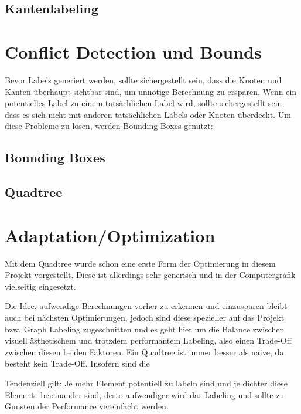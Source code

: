 \documentclass[final,nopreprintline]{elsarticle}
\begin{document}
\subsection{Kantenlabeling}
\label{subsec:labeling_edges}
    


\section{Conflict Detection und Bounds}
\label{sec:conflict}

Bevor Labels generiert werden, sollte sichergestellt sein, dass die Knoten und Kanten überhaupt sichtbar sind,
um unnötige Berechnung zu ersparen. Wenn ein potentielles Label zu einem tatsächlichen Label wird, sollte sichergestellt sein,
dass es sich nicht mit anderen tatsächlichen Labels oder Knoten überdeckt. Um diese Probleme zu lösen, werden Bounding Boxes genutzt:

\subsection{Bounding Boxes}
\label{subsec:bbox}
    

\subsection{Quadtree}
\label{subsec:quadtree}
    


\section{Adaptation/Optimization}
\label{sec:adaptation}

Mit dem Quadtree wurde schon eine erste Form der Optimierung in diesem Projekt vorgestellt.
Diese ist allerdings sehr generisch und in der Computergrafik vielseitig eingesetzt.

Die Idee, aufwendige Berechnungen vorher zu erkennen und einzusparen bleibt auch bei nächsten Optimierungen, jedoch sind diese
spezieller auf das Projekt bzw. Graph Labeling zugeschnitten und es geht hier um die Balance zwischen visuell ästhetischem und trotzdem performantem Labeling,
also einen Trade-Off zwischen diesen beiden Faktoren. Ein Quadtree ist immer besser als naive, da besteht kein Trade-Off.
Insofern sind die

Tendenziell gilt: Je mehr Element potentiell zu labeln sind und je dichter diese Elemente beieinander sind, desto aufwendiger wird das Labeling und sollte zu Gunsten der Performance vereinfacht werden.
\end{document}

